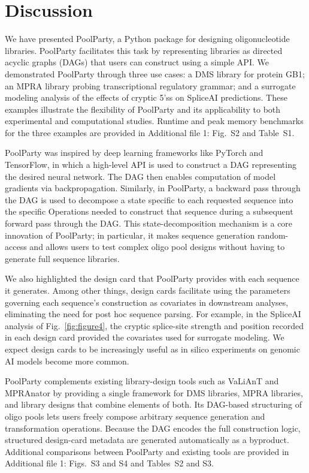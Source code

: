 \documentclass[pdflatex,sn-vancouver-num,referee,oneside]{sn-jnl}
\begin{document}
\section*{Discussion}\label{sec:discussion}

We have presented PoolParty, a Python package for designing oligonucleotide libraries. PoolParty facilitates this task by representing libraries as directed acyclic graphs (DAGs) that users can construct using a simple API. We demonstrated PoolParty through three use cases: a DMS library for protein GB1; an MPRA library probing transcriptional regulatory grammar; and a surrogate modeling analysis of the effects of cryptic 5'ss on SpliceAI predictions. These examples illustrate the flexibility of PoolParty and its applicability to both experimental and computational studies. Runtime and peak memory benchmarks for the three examples are provided in Additional file 1: Fig.~S2 and Table~S1.

PoolParty was inspired by deep learning frameworks like PyTorch and TensorFlow, in which a high-level API is used to construct a DAG representing the desired neural network. The DAG then enables computation of model gradients via backpropagation. Similarly, in PoolParty, a backward pass through the DAG is used to decompose a state specific to each requested sequence into the specific Operations needed to construct that sequence during a subsequent forward pass through the DAG. This state-decomposition mechanism is a core innovation of PoolParty; in particular, it makes sequence generation random-access and allows users to test complex oligo pool designs without having to generate full sequence libraries.

We also highlighted the design card that PoolParty provides with each sequence it generates. Among other things, design cards facilitate using the parameters governing each sequence's construction as covariates in downstream analyses, eliminating the need for post hoc sequence parsing. For example, in the SpliceAI analysis of Fig.~\ref{fig:figure4}, the cryptic splice-site strength and position recorded in each design card provided the covariates used for surrogate modeling. We expect design cards to be increasingly useful as in silico experiments on genomic AI models become more common.

PoolParty complements existing library-design tools such as VaLiAnT \citep{Barbon2022th} and MPRAnator \citep{GeorgakopoulosSoares2017gb} by providing a single framework for DMS libraries, MPRA libraries, and library designs that combine elements of both. Its DAG-based structuring of oligo pools lets users freely compose arbitrary sequence generation and transformation operations. Because the DAG encodes the full construction logic, structured design-card metadata are generated automatically as a byproduct. Additional comparisons between PoolParty and existing tools are provided in Additional file 1: Figs.~S3 and S4 and Tables~S2 and S3.
\end{document}

